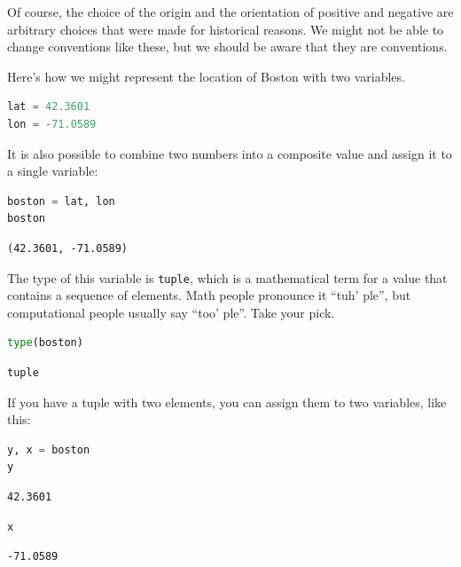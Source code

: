 Of course, the choice of the origin and the orientation of positive and
negative are arbitrary choices that were made for historical reasons. We
might not be able to change conventions like these, but we should be
aware that they are conventions.

Here's how we might represent the location of Boston with two variables.

\begin{lstlisting}[language=Python,style=source]
lat = 42.3601
lon = -71.0589
\end{lstlisting}

It is also possible to combine two numbers into a composite value and
assign it to a single variable:

\begin{lstlisting}[language=Python,style=source]
boston = lat, lon
boston
\end{lstlisting}

\begin{lstlisting}[style=output]
(42.3601, -71.0589)
\end{lstlisting}

The type of this variable is \passthrough{\lstinline!tuple!}, which is a
mathematical term for a value that contains a sequence of elements. Math
people pronounce it ``tuh' ple'', but computational people usually say
``too' ple''. Take your pick.

\begin{lstlisting}[language=Python,style=source]
type(boston)
\end{lstlisting}

\begin{lstlisting}[style=output]
tuple
\end{lstlisting}

If you have a tuple with two elements, you can assign them to two
variables, like this:

\begin{lstlisting}[language=Python,style=source]
y, x = boston
y
\end{lstlisting}

\begin{lstlisting}[style=output]
42.3601
\end{lstlisting}

\begin{lstlisting}[language=Python,style=source]
x
\end{lstlisting}

\begin{lstlisting}[style=output]
-71.0589
\end{lstlisting}

